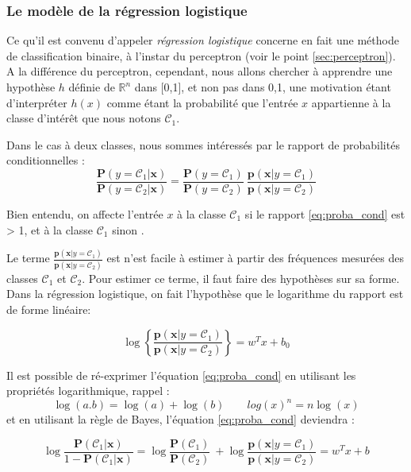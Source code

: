 	
		
		\subsubsection{Le modèle de la régression logistique}
		
		Ce qu'il est convenu d'appeler \textit{régression logistique} concerne en fait une méthode de classification binaire, à l'instar du perceptron (voir le point \ref{sec:perceptron}). A la différence du perceptron, cependant, nous allons chercher à apprendre une hypothèse $h$ définie de $\mathbb{R}^n$ dans [0,1], et non pas dans {0,1},  une motivation étant d'interpréter $h(x)$ comme étant la probabilité que l'entrée $x$ appartienne à la classe d'intérêt que nous notons $\mathcal{C}_1$. \cite{antoine2018apprentissage}
			
		Dans le cas à deux classes, nous sommes intéressés par le rapport de probabilités conditionnelles :
		\begin{equation}\label{eq:proba_cond}
			\frac{\mathbf{P}(y=\mathcal{C}_1|\mathbf{x})}{\mathbf{P}(y=\mathcal{C}_2|\mathbf{x})} = \frac{\mathbf{P}(y=\mathcal{C}_1)}{\mathbf{P}(y=\mathcal{C}_2)} \ \frac{\mathbf{p}(\mathbf{x}|y=\mathcal{C}_1)}{\mathbf{p}(\mathbf{x}|y=\mathcal{C}_2)}
		\end{equation}
		
		Bien entendu, on affecte l'entrée $x$ à la classe $\mathcal{C}_1$ si le rapport \ref{eq:proba_cond} est > 1, et à la classe $\mathcal{C}_1$ sinon \cite{antoine2018apprentissage}.
		
		
		Le terme $\frac{\mathbf{p}(\mathbf{x}|y=\mathcal{C}_1)}{\mathbf{p}(\mathbf{x}|y=\mathcal{C}_2)}$ est n'est facile à estimer à partir des fréquences mesurées des classes $\mathcal{C}_1$ et $\mathcal{C}_2$. Pour estimer ce terme, il faut faire des hypothèses sur sa forme.
		Dans la régression logistique, on fait l'hypothèse que le logarithme du rapport est de forme linéaire: 
		
		$$ 
		\log \left\lbrace \frac{\mathbf{p}(\mathbf{x}|y=\mathcal{C}_1)}{\mathbf{p}(\mathbf{x}|y=\mathcal{C}_2)} \right \rbrace  = w^Tx+b_0
		$$
		
		Il est possible de ré-exprimer l'équation \ref{eq:proba_cond} en utilisant les propriétés logarithmique, rappel :
		$$
		\log(a.b) = \log(a)+\log(b) \qquad log(x)^n = n\log(x) 
		$$
		et en utilisant la règle de Bayes, l'équation \ref{eq:proba_cond} deviendra :
		
		\begin{equation}\label{eq:re_proba_cond}
			\log\frac{\mathbf{P}(\mathcal{C}_1|\mathbf{x})}{1-\mathbf{P}(\mathcal{C}_1|\mathbf{x})} = \log\frac{\mathbf{P}(\mathcal{C}_1)}{\mathbf{P}(\mathcal{C}_2)} \ +\log\frac{\mathbf{p}(\mathbf{x}|y=\mathcal{C}_1)}{\mathbf{p}(\mathbf{x}|y=\mathcal{C}_2)} = w^Tx+b
		\end{equation}
		
